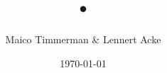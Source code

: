 \documentclass{beamer}
\begin{document}
\title{•}
\author{Maico Timmerman \& Lennert Acke}
\date{\today}
\frame{
\maketitle
}


\end{document}
